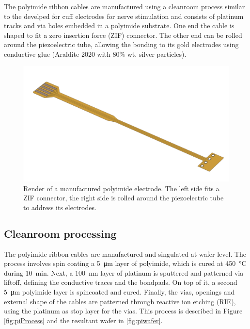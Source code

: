 The polyimide ribbon cables are manufactured using a cleanroom process similar to the develped for cuff electrodes for nerve stimulation \cite{Rodriguez2000} and consists of platinum tracks and via holes embedded in a polyimide substrate. One end the cable is shaped to fit a zero insertion force (ZIF) connector. The other end can be rolled around the piezoelectric tube, allowing the bonding to its gold electrodes using conductive glue (Araldite 2020 with 80\% wt. silver particles).

\begin{figure}[h!]\centering \includegraphics[width=15cm]{figures/40_Fabrication/PI/render.JPG}
      \caption{Render of a manufactured polyimide electrode. The left side fits a ZIF connector, the right side is rolled around the piezoelectric tube to address its electrodes.}
      \label{fig:piRender}
\end{figure}



\subsection{Cleanroom processing}
The polyimide ribbon cables are manufactured and singulated at wafer level. The process involves spin coating a \SI{5}{\micro\meter} layer of polyimide, which is cured at \SI{450}{\celsius} during \SI{10}{\minute}. Next, a \SI{100}{\nano\meter} layer of platinum is sputtered and patterned via liftoff, defining the conductive traces and the bondpads. On top of it, a second \SI{5}{\micro\meter} polyimide layer is spincoated and cured. Finally, the vias, openings and external shape of the cables are patterned through reactive ion etching (RIE), using the platinum as stop layer for the vias. This process is described in Figure \ref{fig:piProcess} and the resultant wafer in \autoref{fig:piwafer}.


